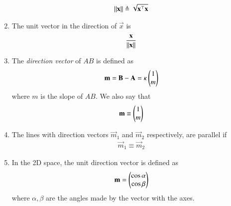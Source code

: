 \begin{enumerate}[label=\thesubsection.\arabic*.,ref=\thesubsection.\theenumi]
\begin{align}
			 \left\lVert\mathbf{x}\right\rVert \triangleq \sqrt{\mathbf{x}^{\top}\mathbf{x}}
		\end{align}
	\item The unit vector in the direction of $\vec{x}$ is 
		\begin{align}
		\label{eq:unit-vec}
			 \frac{\mathbf{x}}{\left\lVert\mathbf{x}\right\rVert} 
		\end{align}
	\item The {\em direction vector} of $AB$ is defined as
		\begin{align}
		\label{eq:dir-vec}
			\mathbf{m}=\mathbf{B}-
			\mathbf{A} = \kappa
			\begin{pmatrix}1 \\ m\end{pmatrix}
		\end{align}
		where $m$ is the slope of $AB$.  We also say that 
\begin{align}
\mathbf{m}\equiv   \begin{pmatrix}1 \\ m\end{pmatrix}
\end{align}
	\item The lines with direction vectors $\vec{m}_1$ and $\vec{m}_2$
		respectively, are parallel if 
\begin{align}
\vec{m}_1\equiv   \vec{m}_2
\end{align}
\item In the 2D space, the unit direction vector is defined as
\begin{align}
		\label{eq:dir-vec-3d}
\mathbf{m}=\begin{pmatrix}\cos \alpha\\ \cos \beta \end{pmatrix}
\end{align}
where ${ \alpha,  \beta }$ are the angles made by the vector with the axes.
\end{enumerate}
